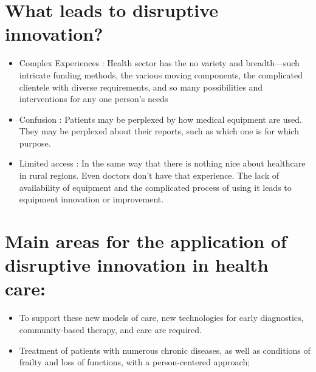 \documentclass[12pt]{article}
\begin{document}
\section*{What leads to disruptive innovation?}
\begin{itemize}

\item Complex Experiences : Health sector has the no variety and breadth—such intricate funding methods, the various moving components, the complicated clientele with diverse requirements, and so many possibilities and interventions for any one person’s needs

\item  Confusion : Patients may be perplexed by how medical equipment are used. They may be perplexed about their reports, such as which one is for which purpose.

\item Limited access : In the same way that there is nothing nice about healthcare in rural regions. Even doctors don't have that experience. The lack of availability of equipment and the complicated process of using it leads to equipment innovation or improvement.
\end{itemize}


\section*{Main areas for the application of disruptive innovation in health care: }
\begin{itemize}





\item To support these new models of care, new technologies for early diagnostics, community-based therapy, and care are required.

\item  Treatment of patients with numerous chronic diseases, as well as conditions of frailty and loss of functions, with a person-centered approach;

\end{itemize}
\end{document}
